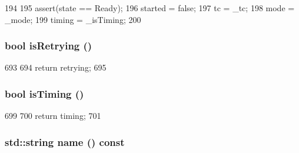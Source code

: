 \begin{DoxyCode}
194 {
195     assert(state == Ready);
196     started = false;
197     tc = _tc;
198     mode = _mode;
199     timing = _isTiming;
200 }
\end{DoxyCode}
\hypertarget{classX86ISA_1_1Walker_1_1WalkerState_a46197e29b4fb481e9f1a932fbbf44586}{
\subsubsection[{isRetrying}]{\setlength{\rightskip}{0pt plus 5cm}bool isRetrying ()}}
\label{classX86ISA_1_1Walker_1_1WalkerState_a46197e29b4fb481e9f1a932fbbf44586}



\begin{DoxyCode}
693 {
694     return retrying;
695 }
\end{DoxyCode}
\hypertarget{classX86ISA_1_1Walker_1_1WalkerState_a9dc00933e3ae5f8801363f2288084154}{
\subsubsection[{isTiming}]{\setlength{\rightskip}{0pt plus 5cm}bool isTiming ()}}
\label{classX86ISA_1_1Walker_1_1WalkerState_a9dc00933e3ae5f8801363f2288084154}



\begin{DoxyCode}
699 {
700     return timing;
701 }
\end{DoxyCode}
\hypertarget{classX86ISA_1_1Walker_1_1WalkerState_a37627d5d5bba7f4a8690c71c2ab3cb07}{
\subsubsection[{name}]{\setlength{\rightskip}{0pt plus 5cm}std::string name () const}}
\label{classX86ISA_1_1Walker_1_1WalkerState_a37627d5d5bba7f4a8690c71c2ab3cb07}



